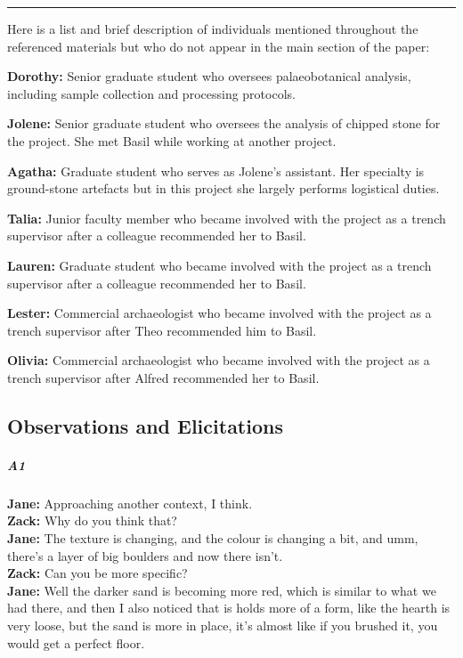 \documentclass[
]{article}
\begin{document}
\begin{center}\rule{0.5\linewidth}{0.5pt}\end{center}

Here is a list and brief description of individuals mentioned throughout
the referenced materials but who do not appear in the main section of
the paper:

\textbf{Dorothy:} Senior graduate student who oversees palaeobotanical
analysis, including sample collection and processing protocols.

\textbf{Jolene:} Senior graduate student who oversees the analysis of
chipped stone for the project. She met Basil while working at another
project.

\textbf{Agatha:} Graduate student who serves as Jolene's assistant. Her
specialty is ground-stone artefacts but in this project she largely
performs logistical duties.

\textbf{Talia:} Junior faculty member who became involved with the
project as a trench supervisor after a colleague recommended her to
Basil.

\textbf{Lauren:} Graduate student who became involved with the project
as a trench supervisor after a colleague recommended her to Basil.

\textbf{Lester:} Commercial archaeologist who became involved with the
project as a trench supervisor after Theo recommended him to Basil.

\textbf{Olivia:} Commercial archaeologist who became involved with the
project as a trench supervisor after Alfred recommended her to Basil.

\subsection{Observations and
Elicitations}\label{observations-and-elicitations}

\subparagraph{A1}\label{sec-A1}

\textbf{Jane:} Approaching another context, I think.\\
\textbf{Zack:} Why do you think that?\\
\textbf{Jane:} The texture is changing, and the colour is changing a
bit, and umm, there's a layer of big boulders and now there isn't.\\
\textbf{Zack:} Can you be more specific?\\
\textbf{Jane:} Well the darker sand is becoming more red, which is
similar to what we had there, and then I also noticed that is holds more
of a form, like the hearth is very loose, but the sand is more in place,
it's almost like if you brushed it, you would get a perfect floor.
\end{document}
